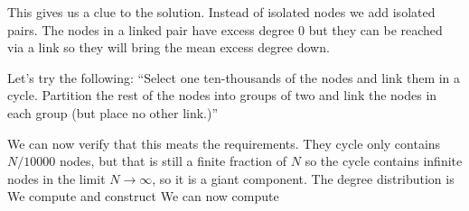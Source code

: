 This gives us a clue to the solution. Instead of isolated nodes we add isolated pairs. The nodes in a linked pair have excess degree 0 but they can be reached via a link so they will bring the mean excess degree down. 

Let's try the following: ``Select one ten-thousands of the nodes and link them in a cycle. Partition the rest of the nodes into groups of two and link the nodes in each group (but place no other link.)''

We can now verify that this meats the requirements. They cycle only contains $N/10000$ nodes, but that is still a finite fraction of $N$ so the cycle contains infinite nodes in the limit $N\to\infty$, so it is a giant component. The degree distribution is 
We compute 
and construct
We can now compute
  